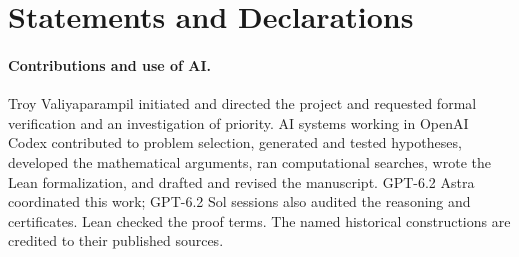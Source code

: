 \documentclass[11pt]{article}
\begin{document}
\section*{Statements and Declarations}
\paragraph{Contributions and use of AI.}
Troy Valiyaparampil initiated and directed the project and requested
formal verification and an investigation of priority. AI systems
working in OpenAI Codex contributed to problem selection, generated
and tested hypotheses, developed the mathematical arguments, ran
computational searches, wrote the Lean formalization, and drafted
and revised the manuscript. GPT-6.2 Astra coordinated this work;
GPT-6.2 Sol sessions also audited the reasoning and certificates.
Lean checked the proof terms. The named historical constructions are
credited to their published sources.



\end{document}
